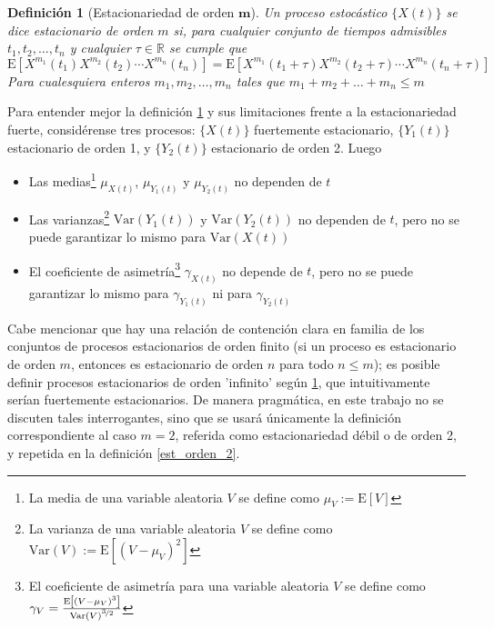 \documentclass[12pt,a4paper]{mitthesis}
\newtheorem{defn}{Definici\'on}
\newcommand{\R}{\mathbb{R}}
\newcommand{\E}[1]{\mathrm{E}\left[ #1 \right]}
\newcommand{\Var}[1]{\mathrm{Var}\left( #1 \right)}
\begin{document}
\begin{defn}[Estacionariedad de orden $\boldsymbol{m}$]
Un proceso estoc\'astico $\{ X(t) \}$ se dice estacionario de orden $m$ si, para cualquier conjunto 
de tiempos admisibles $t_1,t_2,\dots,t_n$ y cualquier $\tau \in \R$ se cumple que
\begin{equation*}
\E{ X^{m_1}(t_1)X^{m_2}(t_2)\cdots X^{m_n}(t_n) }
=
\E{ X^{m_1}(t_1+\tau)X^{m_2}(t_2+\tau)\cdots X^{m_n}(t_n+\tau) }
\end{equation*}
Para cualesquiera enteros $m_1,m_2,\dots,m_n$ tales que $m_1+m_2+\dots+m_n \leq m$
\label{est_orden_m}
\end{defn}

Para entender mejor la definici\'on \ref{est_orden_m} y sus limitaciones frente a la 
estacionariedad fuerte, consid\'erense tres procesos: $\{X(t)\}$ fuertemente estacionario, 
$\{Y_1(t)\}$ estacionario de orden 1, y $\{Y_2(t)\}$ estacionario de orden 2. Luego
\begin{itemize}
\item Las medias\footnote{La media de una variable aleatoria $V$ se define como $ \mu_V := \E{V}$} 
$ \mu_{X(t)}$, $ \mu_{Y_1(t)}$ y $ \mu_{Y_2(t)}$ no dependen de $t$

\item Las varianzas\footnote{La varianza de una variable aleatoria $V$ se define como 
$ \Var{V} := \E{\left(V - \mu_V \right)^{2}}$} $ \Var{Y_1(t)}$ y $ \Var{Y_2(t)}$ no dependen de 
$t$, pero no se puede garantizar lo mismo para $\Var{X(t)}$

\item El coeficiente de asimetr\'ia\footnote{El coeficiente de asimetr\'ia para una variable 
aleatoria $V$ se define como 
$\gamma_V = \frac{\E{\left(V-\mu_V\right)^{3}}}{\Var{V}^{\nicefrac{3}{2}}}$}
$ \gamma_{X(t)}$ no depende de $t$, pero no se puede garantizar lo mismo para $ \gamma_{Y_1(t)}$ ni 
para $ \gamma_{Y_2(t)}$
\end{itemize}

Cabe mencionar que hay una relaci\'on de contenci\'on clara en familia de los conjuntos de procesos 
estacionarios de orden finito (si un proceso es estacionario de orden $m$, entonces es estacionario 
de orden $n$ para todo $n \leq m$); es posible definir procesos estacionarios de orden 'infinito' 
seg\'un \ref{est_orden_m}, que intuitivamente ser\'ian fuertemente estacionarios. 
De manera pragm\'atica, en este trabajo no se discuten tales interrogantes, sino que se usar\'a 
\'unicamente la definici\'on correspondiente al caso $m=2$, referida como estacionariedad d\'ebil o 
de orden 2, y repetida en la definici\'on \ref{est_orden_2}.
\end{document}
